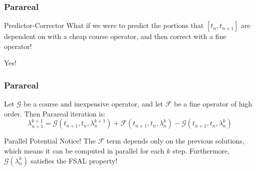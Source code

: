 \documentclass[pdf,12pt]{beamer}
\begin{document}
\begin{frame}
  \frametitle{Parareal}
  \begin{alertblock}{Predictor-Corrector}
    What if we were to predict the portions that $[t_n, t_{n+1}]$ are dependent
    on with a cheap course operator, and then correct with a fine operator!
  \end{alertblock}
  Yes!
\end{frame}

\begin{frame}
  \frametitle{Parareal}
  Let $\mathcal{G}$ be a course and inexpensive operator, and let $\mathcal{F}$
  be a fine operator of high order. Then Parareal iteration is:
  \[
    \lambda_{n+1}^{k+1} = \mathcal{G}(t_{n+1},t_n,\lambda_n^{k+1}) + 
    \mathcal{F}(t_{n+1},t_n,\lambda_n^k) - \mathcal{G}(t_{n+1},t_n,\lambda_n^k)
  \]
  \begin{block}{Parallel Potential}
    Notice! The $\mathcal{F}$ term depends only on the previous solutions, which
    means it can be computed in parallel for each $k$ step. Furthermore,
    $\mathcal{G}(\lambda_n^k)$ satisfies the FSAL property!
  \end{block}
\end{frame}
\end{document}
